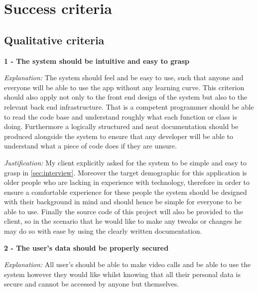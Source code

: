 \section{Success criteria}

\subsection{Qualitative criteria}

\textsf{\bfseries 1 - The system should be intuitive and easy to grasp}
\vspace{0.1cm}

\textit{Explanation:}
The system should feel and be easy to use, such that anyone
and everyone will be able to use the app without any learning
curve. This criterion should also apply not only to the front
end design of the system but also to the relevant back end 
infrastructure. That is a competent programmer should be able to 
read the code base and understand roughly what each function or 
class is doing. Furthermore a logically structured and neat 
documentation should be produced alongside the system to 
ensure that any developer will be able to understand what 
a piece of code does if they are unsure.

\vspace{0.1cm}

\textit{Justification:} 
My client explicitly asked for the system to be simple and 
easy to grasp in \ref{sec:interview}. Moreover the target 
demographic for this application is older people who are 
lacking in experience with technology, therefore in order to 
ensure a comfortable experience for these people the system 
should be designed with their background in mind and should
hence be simple for everyone to be able to use. Finally the 
source code of this project will also be provided to the 
client, so in the scenario that he would like to make any 
tweaks or changes he may do so with ease by using the clearly 
written documentation.

\vspace{0.2cm}

\textsf{\bfseries 2 - The user's data should be properly secured} 

\vspace{0.1cm}

\textit{Explanation:} 
All user's should be able to make video calls and be able to 
use the system however they would like whilst knowing that all
their personal data is secure and cannot be accessed by anyone
but themselves.

